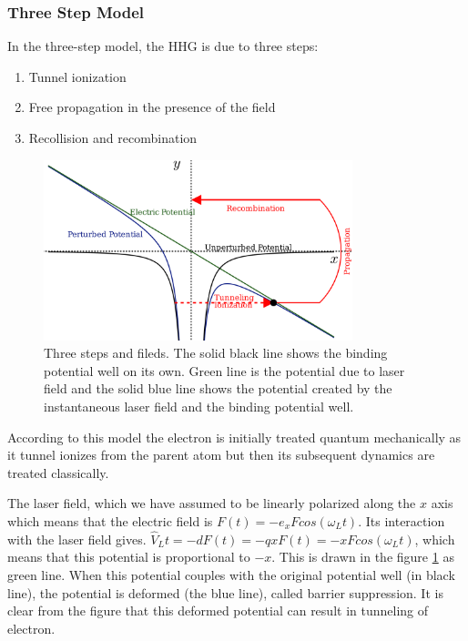 \documentclass[12pt]{article}
\begin{document}
\subsubsection{Three Step Model}

In the three-step model, the HHG is due to three steps:
\begin{enumerate}
    \item Tunnel ionization
    \item Free propagation in the presence of the field
    \item Recollision and recombination
\end{enumerate}
\begin{figure}[h]
    \centering
    \includegraphics[width=0.8\textwidth]{images/three_step_one.png}
    \caption{Three steps and fileds. The solid black line shows the binding potential well on its own. Green line is the potential due to laser field and the solid blue line shows the potential created by the instantaneous laser field and the binding potential well.  }
    \label{fig:3-step-1}
\end{figure}

According to this model the electron is initially treated quantum
mechanically as it tunnel ionizes from the parent atom but then its
subsequent dynamics are treated classically.

The laser field, which we have assumed to be linearly polarized along the $x$ axis which means that the electric field is \(F(t) = -e_xFcos(\omega_L t)\). Its interaction with the laser field gives. \(\hat V_L t=-dF(t) = -qxF(t)=-xFcos(\omega_Lt)\), which means that this potential is proportional to $-x$. This is drawn in the figure \ref{fig:3-step-1} as green line. When this potential couples with the original potential well (in black line), the potential is deformed (the blue line), called barrier suppression. It is clear from the figure that this deformed potential can result in tunneling of electron.
\end{document}
